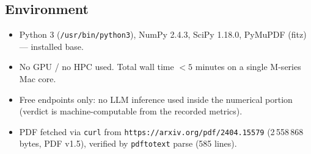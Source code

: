 \documentclass[11pt]{article}
\begin{document}
\subsection{Environment}
\begin{itemize}
  \item Python 3 (\texttt{/usr/bin/python3}), NumPy 2.4.3, SciPy 1.18.0, PyMuPDF (fitz) --- installed base.
  \item No GPU / no HPC used. Total wall time $<5$ minutes on a single M-series Mac core.
  \item Free endpoints only: no LLM inference used inside the numerical portion (verdict is machine-computable from the recorded metrics).
  \item PDF fetched via \texttt{curl} from
    \texttt{https://arxiv.org/pdf/2404.15579}
    (2\,558\,868 bytes, PDF v1.5), verified by \texttt{pdftotext} parse (585 lines).
\end{itemize}
\end{document}
